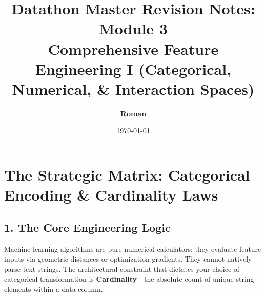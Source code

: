 \documentclass[12pt,a4paper]{article}
\title{\textbf{\color{primary}Datathon Master Revision Notes: Module 3 \\ Comprehensive Feature Engineering I (Categorical, Numerical, \& Interaction Spaces)}}
\author{\textbf{Roman}}
\date{\today}
\begin{document}
\color{darktext}
\maketitle

\section{The Strategic Matrix: Categorical Encoding \& Cardinality Laws}
\subsection*{1. The Core Engineering Logic}
Machine learning algorithms are pure numerical calculators; they evaluate feature inputs via geometric distances or optimization gradients. They cannot natively parse text strings. The architectural constraint that dictates your choice of categorical transformation is \textbf{Cardinality}—the absolute count of unique string elements within a data column.
\end{document}
